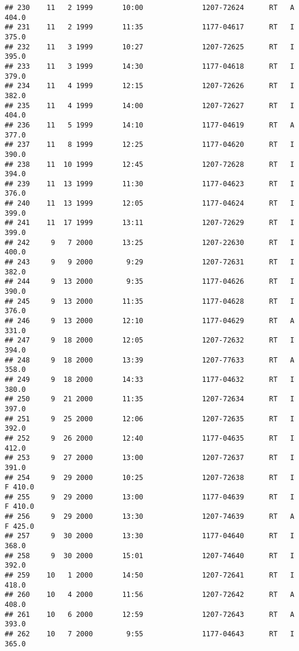 \documentclass[
]{article}
\begin{document}
\begin{verbatim}
## 230    11   2 1999       10:00              1207-72624      RT   A     404.0
## 231    11   2 1999       11:35              1177-04617      RT   I     375.0
## 232    11   3 1999       10:27              1207-72625      RT   I     395.0
## 233    11   3 1999       14:30              1177-04618      RT   I     379.0
## 234    11   4 1999       12:15              1207-72626      RT   I     382.0
## 235    11   4 1999       14:00              1207-72627      RT   I     404.0
## 236    11   5 1999       14:10              1177-04619      RT   A     377.0
## 237    11   8 1999       12:25              1177-04620      RT   I     390.0
## 238    11  10 1999       12:45              1207-72628      RT   I     394.0
## 239    11  13 1999       11:30              1177-04623      RT   I     376.0
## 240    11  13 1999       12:05              1177-04624      RT   I     399.0
## 241    11  17 1999       13:11              1207-72629      RT   I     399.0
## 242     9   7 2000       13:25              1207-22630      RT   I     400.0
## 243     9   9 2000        9:29              1207-72631      RT   I     382.0
## 244     9  13 2000        9:35              1177-04626      RT   I     390.0
## 245     9  13 2000       11:35              1177-04628      RT   I     376.0
## 246     9  13 2000       12:10              1177-04629      RT   A     331.0
## 247     9  18 2000       12:05              1207-72632      RT   I     394.0
## 248     9  18 2000       13:39              1207-77633      RT   A     358.0
## 249     9  18 2000       14:33              1177-04632      RT   I     380.0
## 250     9  21 2000       11:35              1207-72634      RT   I     397.0
## 251     9  25 2000       12:06              1207-72635      RT   I     392.0
## 252     9  26 2000       12:40              1177-04635      RT   I     412.0
## 253     9  27 2000       13:00              1207-72637      RT   I     391.0
## 254     9  29 2000       10:25              1207-72638      RT   I   F 410.0
## 255     9  29 2000       13:00              1177-04639      RT   I   F 410.0
## 256     9  29 2000       13:30              1207-74639      RT   A   F 425.0
## 257     9  30 2000       13:30              1177-04640      RT   I     368.0
## 258     9  30 2000       15:01              1207-74640      RT   I     392.0
## 259    10   1 2000       14:50              1207-72641      RT   I     418.0
## 260    10   4 2000       11:56              1207-72642      RT   A     408.0
## 261    10   6 2000       12:59              1207-72643      RT   A     393.0
## 262    10   7 2000        9:55              1177-04643      RT   I     365.0

\end{verbatim}
\end{document}
